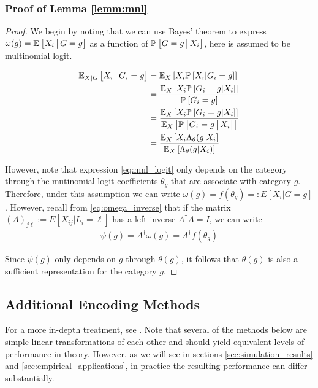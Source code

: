\documentclass{article}
\theoremstyle{plain}
\theoremstyle{definition}
\theoremstyle{remark}
\begin{document}
\subsubsection{Proof of Lemma \ref{lemm:mnl}} \label{proof:mnl}
\begin{proof}
We begin by noting that we can use Bayes' theorem to express $\omega(g) = \EE{ X_{i} \cond G=g }$ as a function of $\PP{G=g \cond X_{i} }$, here is assumed to be multinomial logit.

\begin{align}
  \EE[X|G] { X_{i} \cond G_{i} = g }
  &=  \EE[X] { X_{i} \PP{X_{i} | G_{i} = g} }  \\
  &= \frac{\EE[X]{ X_{i} \PP{G_{i} = g|X_{i}}}}{\PP{G_{i} = g}} \label{eq:mnl_bayes} \\
  &= \frac{\EE[X]{ X_{i} \PP{G_{i} = g|X_{i}}}}{\EE[X] { \PP{G_{i} = g \cond X_{i}}}}  \\
  &= \frac{\EE[X]{ X_{i} \Lambda_{\theta}(g|X_{i}} }{ \EE[X]{\Lambda_{\theta}( g | X_{i})}}  \label{eq:mnl_logit}
\end{align}

However, note that expression \eqref{eq:mnl_logit} only depends on the category through the mutinomial logit coefficients $\theta_{g}$ that are associate with category $g$. Therefore, under this assumption we can write $\omega(g) = f(\theta_g) =: E[X_{i} | G=g]$. However, recall from \eqref{eq:omega_inverse} that if the matrix $(A)_{j\ell} := E[X_{ij} | L_{i}=\ell]$ has a left-inverse $A^{\dagger}A = I$, we can write
\begin{align}
\psi(g) = A^\dagger \omega(g) = A^\dagger f(\theta_{g})
\end{align}

Since $\psi(g)$ only depends on $g$ through $\theta(g)$, it follows that $\theta(g)$ is also a sufficient representation for the category $g$.
\end{proof}

\subsection{Additional Encoding Methods}{\label{app:encodings}}

For a more in-depth treatment, see \cite{venables2016codingmatrices}. Note that several of the methods below are simple linear transformations of each other and should yield equivalent levels of performance in theory. However, as we will see in sections \ref{sec:simulation_results} and \ref{sec:empirical_applications}, in practice the resulting performance can differ substantially.
\end{document}
